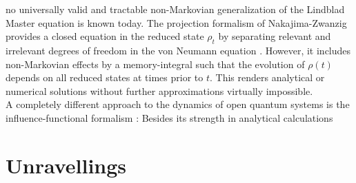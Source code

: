 
no universally valid and tractable non-Markovian generalization of the Lindblad Master equation is known today.
The projection formalism of Nakajima-Zwanzig provides a closed equation in the reduced state $\rho_t$ by separating relevant and irrelevant degrees of freedom in the von Neumann equation \cite{BrPe2002_open_quantum}.
However, it includes non-Markovian effects by a memory-integral such that the evolution of $\rho(t)$ depends on all reduced states at times prior to $t$.
This renders analytical or numerical solutions without further approximations virtually impossible.\\


A completely different approach to the dynamics of open quantum systems is the influence-functional formalism \cite{FeVe63_quantum_dissipative,FeHi10_path_integrals}:
Besides its strength in analytical calculations


\section{Unravellings}
\label{sec:intro.unravellings}




%



